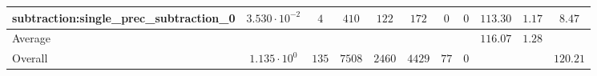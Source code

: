 \begin{tabular}{|l|c|c|c|c|c|c|c|c|c|c|}
subtraction:single\_prec\_subtraction\_0         & $ 3.530 \cdot 10^{-2} $ & $ 4      $ & $ 410  $ & $ 122  $ & $ 172   $ & $ 0  $ & $ 0 $ & $ 113.30      $ & $ 1.17    $ & $ 8.47    $ \\
\hline
Average                                          & $                     $ & $        $ & $      $ & $      $ & $       $ & $    $ & $   $ & $ 116.07      $ & $ 1.28    $ & $         $ \\
\hline
Overall                                          & $ 1.135 \cdot 10^{0}  $ & $ 135    $ & $ 7508 $ & $ 2460 $ & $ 4429  $ & $ 77 $ & $ 0 $ & $             $ & $         $ & $ 120.21  $ \\
\hline
\end{tabular}
